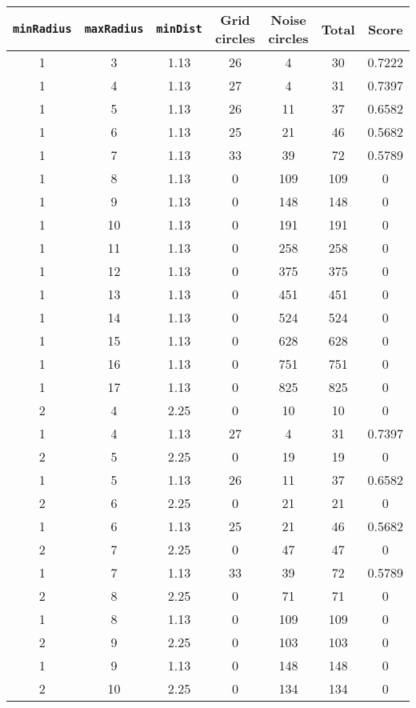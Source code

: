 \documentclass[letterpaper, 12pt]{article}
\begin{document}
\begin{longtable}{|c|c|c|c|c|c|c|}
\hline
\textbf{\texttt{minRadius}} & \textbf{\texttt{maxRadius}} & \textbf{\texttt{minDist}} & \textbf{Grid circles} & \textbf{Noise circles} & \textbf{Total} & \textbf{Score} \\
\hline
1 & 3 & 1.13 & 26 & 4 & 30 & 0.7222 \\
\hline
1 & 4 & 1.13 & 27 & 4 & 31 & 0.7397 \\
\hline
1 & 5 & 1.13 & 26 & 11 & 37 & 0.6582 \\
\hline
1 & 6 & 1.13 & 25 & 21 & 46 & 0.5682 \\
\hline
1 & 7 & 1.13 & 33 & 39 & 72 & 0.5789 \\
\hline
1 & 8 & 1.13 & 0 & 109 & 109 & 0 \\
\hline
1 & 9 & 1.13 & 0 & 148 & 148 & 0 \\
\hline
1 & 10 & 1.13 & 0 & 191 & 191 & 0 \\
\hline
1 & 11 & 1.13 & 0 & 258 & 258 & 0 \\
\hline
1 & 12 & 1.13 & 0 & 375 & 375 & 0 \\
\hline
1 & 13 & 1.13 & 0 & 451 & 451 & 0 \\
\hline
1 & 14 & 1.13 & 0 & 524 & 524 & 0 \\
\hline
1 & 15 & 1.13 & 0 & 628 & 628 & 0 \\
\hline
1 & 16 & 1.13 & 0 & 751 & 751 & 0 \\
\hline
1 & 17 & 1.13 & 0 & 825 & 825 & 0 \\
\hline
2 & 4 & 2.25 & 0 & 10 & 10 & 0 \\
\hline
1 & 4 & 1.13 & 27 & 4 & 31 & 0.7397 \\
\hline
2 & 5 & 2.25 & 0 & 19 & 19 & 0 \\
\hline
1 & 5 & 1.13 & 26 & 11 & 37 & 0.6582 \\
\hline
2 & 6 & 2.25 & 0 & 21 & 21 & 0 \\
\hline
1 & 6 & 1.13 & 25 & 21 & 46 & 0.5682 \\
\hline
2 & 7 & 2.25 & 0 & 47 & 47 & 0 \\
\hline
1 & 7 & 1.13 & 33 & 39 & 72 & 0.5789 \\
\hline
2 & 8 & 2.25 & 0 & 71 & 71 & 0 \\
\hline
1 & 8 & 1.13 & 0 & 109 & 109 & 0 \\
\hline
2 & 9 & 2.25 & 0 & 103 & 103 & 0 \\
\hline
1 & 9 & 1.13 & 0 & 148 & 148 & 0 \\
\hline
2 & 10 & 2.25 & 0 & 134 & 134 & 0 \\

\end{longtable}
\end{document}
